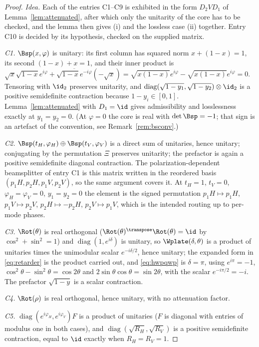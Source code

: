 \begin{proof}
\emph{Idea.} Each of the entries C1--C9 is exhibited in the form $D_2VD_1$ of
Lemma~\ref{lem:attenuated}, after which only the unitarity of the core has to
be checked, and the lemma then gives (i) and the lossless case (ii) together.
Entry C10 is decided by its hypothesis, checked on the supplied matrix.

\emph{C1.} $\Bsp(x,\varphi)$ is unitary: its first column has squared norm
$x+(1-x)=1$, its second $(1-x)+x=1$, and their inner product is
$\sqrt{x}\sqrt{1-x}e^{i\varphi}+\overline{\sqrt{1-x}e^{-i\varphi}}(-\sqrt{x})
=\sqrt{x(1-x)}e^{i\varphi}-\sqrt{x(1-x)}e^{i\varphi}=0$. Tensoring with
$\id_2$ preserves unitarity, and
$\operatorname{diag}(\sqrt{1-y_1},\sqrt{1-y_2})\otimes\id_2$ is a positive
semidefinite contraction because $1-y_i\in[0,1]$. Lemma~\ref{lem:attenuated}
with $D_1=\id$ gives admissibility and losslessness exactly at $y_1=y_2=0$.
(At $\varphi=0$ the core is real with $\det\Bsp=-1$; that sign is an artefact
of the convention, see Remark~\ref{rem:bsconv}.)

\emph{C2.} $\Bsp(t_H,\varphi_H)\oplus\Bsp(t_V,\varphi_V)$ is a direct sum of
unitaries, hence unitary; conjugating by the permutation $\Xi$ preserves
unitarity; the prefactor is again a positive semidefinite diagonal contraction.
The polarization-dependent beamsplitter of entry C1 is this matrix written in
the reordered basis $(p_1H,p_2H,p_1V,p_2V)$, so the same argument covers it.
At $t_H=1$, $t_V=0$, $\varphi_H=\varphi_V=0$, $y_1=y_2=0$ the element is the
signed permutation
$p_1H\mapsto p_1H$, $p_1V\mapsto p_2V$, $p_2H\mapsto -p_2H$,
$p_2V\mapsto p_1V$, which is the intended routing up to per-mode phases.

\emph{C3.} $\Rot(\theta)$ is real orthogonal ($\Rot(\theta)^{\transpose}
\Rot(\theta)=\id$ by $\cos^2+\sin^2=1$) and
$\operatorname{diag}(1,e^{i\delta})$ is unitary, so
$\Wplate(\delta,\theta)$ is a product of unitaries times the unimodular scalar
$e^{-i\delta/2}$, hence unitary; the expanded form in \eqref{eq:retarder} is
the product carried out, and \eqref{eq:hwpqwp} is $\delta=\pi$, using
$e^{i\pi}=-1$, $\cos^2\theta-\sin^2\theta=\cos2\theta$ and
$2\sin\theta\cos\theta=\sin2\theta$, with the scalar $e^{-i\pi/2}=-i$. The
prefactor $\sqrt{1-y}$ is a scalar contraction.

\emph{C4.} $\Rot(\rho)$ is real orthogonal, hence unitary, with no attenuation
factor.

\emph{C5.} $\operatorname{diag}(e^{i\varphi_H},e^{i\varphi_V})F$ is a product
of unitaries ($F$ is diagonal with entries of modulus one in both cases), and
$\operatorname{diag}(\sqrt{R_H},\sqrt{R_V})$ is a positive semidefinite
contraction, equal to $\id$ exactly when $R_H=R_V=1$.


\end{proof}
